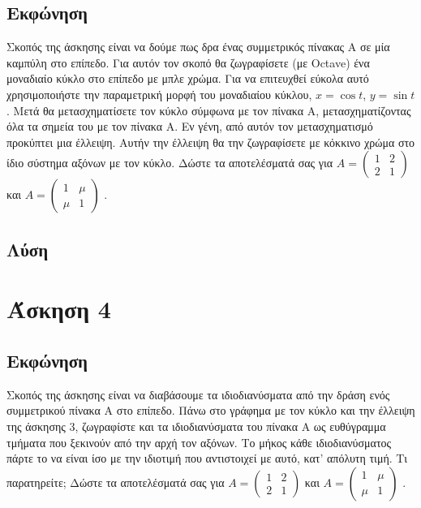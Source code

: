 \documentclass[a4paper,12pt]{article}
\begin{document}
\subsection{Εκφώνηση}
Σκοπός της άσκησης είναι να δούμε πως δρα ένας συμμετρικός πίνακας Α σε μία καμπύλη στο επίπεδο.
Για αυτόν τον σκοπό θα ζωγραφίσετε (με Octave) ένα μοναδιαίο κύκλο στο επίπεδο με μπλε χρώμα.
Για να επιτευχθεί εύκολα αυτό χρησιμοποιήστε την παραμετρική μορφή του μοναδιαίου κύκλου, $x=\cos{t}$,
$y=\sin{t}$. Μετά θα μετασχηματίσετε τον κύκλο σύμφωνα με τον πίνακα Α, μετασχηματίζοντας όλα τα σημεία
του με τον πίνακα Α. Εν γένη, από αυτόν τον μετασχηματισμό προκύπτει μια έλλειψη. Αυτήν την έλλειψη θα την
ζωγραφίσετε με κόκκινο χρώμα στο ίδιο σύστημα αξόνων με τον κύκλο. Δώστε τα αποτελέσματά σας για
$
    A=\begin{pmatrix}
        1 & 2 \\
        2 & 1
    \end{pmatrix}
$
και
$
    A=\begin{pmatrix}
        1   & \mu \\
        \mu & 1
    \end{pmatrix}
$
.
\subsection{Λύση}
\newpage\section{Άσκηση 4}
\subsection{Εκφώνηση}
Σκοπός της άσκησης είναι να διαβάσουμε τα ιδιοδιανύσματα από την δράση ενός συμμετρικού πίνακα Α στο
επίπεδο. Πάνω στο γράφημα με τον κύκλο και την έλλειψη της άσκησης 3, ζωγραφίστε και τα ιδιοδιανύσματα
του πίνακα Α ως ευθύγραμμα τμήματα που ξεκινούν από την αρχή τον αξόνων. Το μήκος κάθε ιδιοδιανύσματος
πάρτε το να είναι ίσο με την ιδιοτιμή που αντιστοιχεί με αυτό, κατ' απόλυτη τιμή. Τι παρατηρείτε; Δώστε
τα αποτελέσματά σας για
$
    A=\begin{pmatrix}
        1 & 2 \\
        2 & 1
    \end{pmatrix}
$
και
$
    A=\begin{pmatrix}
        1   & \mu \\
        \mu & 1
    \end{pmatrix}
$
.
\end{document}
